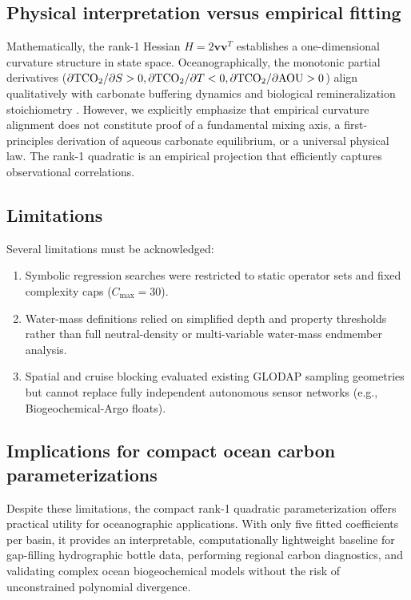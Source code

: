 \subsection{Physical interpretation versus empirical fitting}
Mathematically, the rank-1 Hessian $H = 2 \mathbf{v} \mathbf{v}^T$ establishes a one-dimensional curvature structure in state space. Oceanographically, the monotonic partial derivatives ($\partial\mathrm{TCO_2}/\partial S > 0, \partial\mathrm{TCO_2}/\partial T < 0, \partial\mathrm{TCO_2}/\partial\mathrm{AOU} > 0$) align qualitatively with carbonate buffering dynamics and biological remineralization stoichiometry \citep{Sarmiento2006}. However, we explicitly emphasize that empirical curvature alignment does not constitute proof of a fundamental mixing axis, a first-principles derivation of aqueous carbonate equilibrium, or a universal physical law. The rank-1 quadratic is an empirical projection that efficiently captures observational correlations.

\subsection{Limitations}
Several limitations must be acknowledged:
\begin{enumerate}[label=(\roman*)]
\item Symbolic regression searches were restricted to static operator sets and fixed complexity caps ($C_{\max}=30$).
\item Water-mass definitions relied on simplified depth and property thresholds rather than full neutral-density or multi-variable water-mass endmember analysis.
\item Spatial and cruise blocking evaluated existing GLODAP sampling geometries but cannot replace fully independent autonomous sensor networks (e.g., Biogeochemical-Argo floats).
\end{enumerate}

\subsection{Implications for compact ocean carbon parameterizations}
Despite these limitations, the compact rank-1 quadratic parameterization offers practical utility for oceanographic applications. With only five fitted coefficients per basin, it provides an interpretable, computationally lightweight baseline for gap-filling hydrographic bottle data, performing regional carbon diagnostics, and validating complex ocean biogeochemical models without the risk of unconstrained polynomial divergence.
